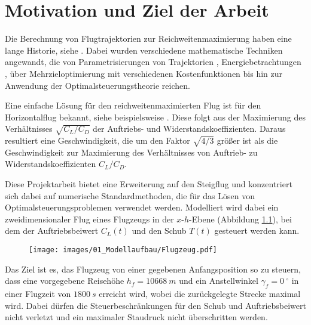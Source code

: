 \chapter{Motivation und Ziel der Arbeit}
Die Berechnung von Flugtrajektorien zur Reichweitenmaximierung haben eine lange Historie, siehe \cite{Burrows1982, Murrieta2016, Schaback2017, Pierson1989}.  Dabei wurden verschiedene mathematische Techniken angewandt, die von Parametrisierungen von Trajektorien \cite{Burrows1982}, Energiebetrachtungen \cite{Calise1977}, über Mehrzieloptimierung mit verschiedenen Kostenfunktionen \cite{Gardi2016} bis hin zur Anwendung der Optimalsteuerungstheorie \cite{Javier2016}  reichen. 

Eine einfache Lösung für den reichweitenmaximierten Flug ist für den Horizontalflug bekannt, siehe beispielsweise \cite{Peckham1974}. Diese folgt aus der Maximierung des Verhältnisses $\sqrt{C_{L}/C_{D}}$ der Auftriebs- und Widerstandskoeffizienten. Daraus resultiert eine Geschwindigkeit, die um den Faktor $\sqrt{4/3}$ größer ist als die Geschwindigkeit zur Maximierung des Verhältnisses von Auftrieb- zu Widerstandskoeffizienten $C_{L}/C_{D}$. \cite{Schaback2017}

Diese Projektarbeit bietet eine Erweiterung auf den Steigflug und konzentriert sich dabei auf numerische Standardmethoden, die für das Lösen von Optimalsteuerungsproblemen verwendet werden. Modelliert wird dabei ein zweidimensionaler Flug eines Flugzeugs in der $x$-$h$-Ebene (Abbildung \ref{img:Flugzeug}), bei dem der Auftriebsbeiwert $C_L(t)$ und den Schub $T(t)$ gesteuert werden kann.

\begin{figure}[H]
    \begin{center}
        \texttt{[image: images/01\_Modellaufbau/Flugzeug.pdf]}
        \label{img:Flugzeug}
    \end{center}
\end{figure}

Das Ziel ist es, das Flugzeug von einer gegebenen Anfangsposition so zu steuern, dass eine vorgegebene Reisehöhe $h_f = 10668\ m$ und ein Anstellwinkel $\gamma_f = 0\ ^{\circ}$ in einer Flugzeit von $1800 \ s$ erreicht  wird, wobei die zurückgelegte Strecke maximal wird. Dabei dürfen die Steuerbeschränkungen für den Schub und Auftriebsbeiwert nicht verletzt und ein maximaler Staudruck nicht überschritten werden. 

